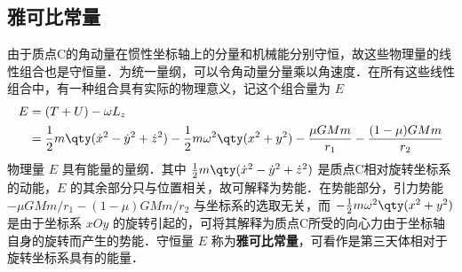\subsection{雅可比常量}
由于质点C的角动量在惯性坐标轴上的分量和机械能分别守恒，故这些物理量的线性组合也是守恒量．为统一量纲，可以令角动量分量乘以角速度．在所有这些线性组合中，有一种组合具有实际的物理意义，记这个组合量为 $E$ 
\begin{equation}%
\begin{aligned}
E &=(T+U)-\omega L_z\\
&=\frac{1}{2}m\qty(\dot{x}^2-\dot{y}^2+\dot{z}^2)-\frac{1}{2}m\omega^2\qty(x^2+y^2)-\frac{\mu GMm}{r_1}-\frac{(1-\mu)GMm}{r_2}
\end{aligned}
\end{equation}
物理量 $E$ 具有能量的量纲．其中 $\frac{1}{2}m\qty(\dot{x}^2-\dot{y}^2+\dot{z}^2)$ 是质点C相对旋转坐标系的动能，$E$ 的其余部分只与位置相关，故可解释为势能．在势能部分，引力势能 $-\mu GMm/r_1-(1-\mu)GMm/r_2$ 与坐标系的选取无关，而 $-\frac{1}{2}m\omega^2\qty(x^2+y^2)$ 是由于坐标系 $xOy$ 的旋转引起的，可将其解释为质点C所受的向心力由于坐标轴自身的旋转而产生的势能．守恒量 $E$ 称为\textbf{雅可比常量}，可看作是第三天体相对于旋转坐标系具有的能量．

